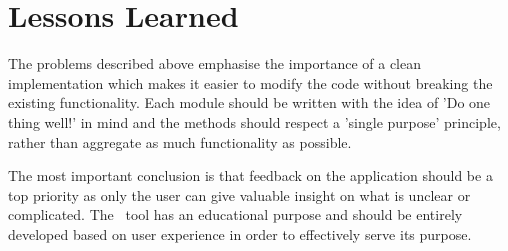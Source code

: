 \section{Lessons Learned}
\label{sec:lessons-learned}

The problems described above emphasise the importance of a clean implementation which makes it easier to modify the code without breaking the existing functionality. Each module should be written with the idea of 'Do one thing well!' in mind and the methods should respect a 'single purpose' principle, rather than aggregate as much functionality as possible.

The most important conclusion is that feedback on the application should be a top priority as only the user can give valuable insight on what is unclear or complicated. The \project\ tool has an educational purpose and should be entirely developed based on user experience in order to effectively serve its purpose.
